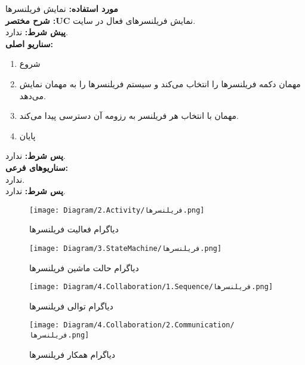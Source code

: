 
\textbf{مورد استفاده:}
نمایش فریلنسرها
\\
\textbf{شرح مختصر :UC}
نمایش فریلنسرهای فعال در سایت.
\\
\textbf{پيش شرط:}
ندارد.
\\
\textbf{سناريو اصلی:}
\begin{enumerate}
\item
شروع
\item
مهمان دکمه فریلنسرها را انتخاب می‌کند و سیستم فریلنسرها را به مهمان نمایش می‌دهد.
\item
مهمان با انتخاب هر فریلنسر به رزومه آن دسترسی پیدا می‌کند.
\item
پایان
\end{enumerate}

\noindent
\textbf{پس شرط:}
ندارد.
\\
\textbf{سناريوهای فرعی:}
\\
ندارد.
\\
\textbf{پس شرط:}
ندارد.


\begin{figure}[H]
	\centering
	\texttt{[image: Diagram/2.Activity/فریلنسرها.png]}
	\caption{دیاگرام فعالیت فریلنسر‌ها}
	\label{fig:a:فریلنسر‌ها}
\end{figure}
\begin{figure}[H]
\centering
\texttt{[image: Diagram/3.StateMachine/فریلنسرها.png]}
\caption{دیاگرام حالت ماشین فریلنسر‌ها}
\label{fig:sm:فریلنسر‌ها}
\end{figure}
\begin{figure}[H]
	\centering
	\texttt{[image: Diagram/4.Collaboration/1.Sequence/فریلنسرها.png]}
	\caption{دیاگرام توالی فریلنسر‌ها}
	\label{fig:s:فریلنسر‌ها}
\end{figure}
\begin{figure}[H]
	\centering
	\texttt{[image: Diagram/4.Collaboration/2.Communication/فریلنسرها.png]}
	\caption{دیاگرام همکار فریلنسر‌ها}
	\label{fig:c:فریلنسر‌ها}
\end{figure}
